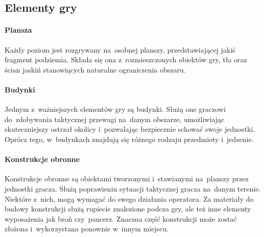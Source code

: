 \documentclass[licencjacka]{pracamgr}
\begin{document}
    \subsection{Elementy gry}
      \paragraph{Plansza}
	Każdy poziom jest rozgrywany na~osobnej planszy, przedstawiającej jakiś fragment podziemia. Składa się ona z~rozmieszczonych
	obiektów gry, tła oraz~ ścian jaskiń stanowiących naturalne ograniczenia obszaru.
      \paragraph{Budynki}
	Jednym z~ważniejszych elementów gry są budynki. Służą one graczowi do~zdobywania taktycznej przewagi na~danym
	obszarze, umożliwiając skuteczniejszy ostrzał okolicy i~pozwalając bezpiecznie schować swoje jednostki. Oprócz tego,
	w~budynkach znajdują się różnego rodzaju przedmioty i~jedzenie.
      \paragraph{Konstrukcje obronne}
	Konstrukcje obronne są obiektami tworzonymi i~stawianymi na~planszy przez jednostki gracza. Służą poprawieniu sytuacji
	taktycznej gracza na~danym terenie. Niektóre z~nich, mogą wymagać do swego działania operatora. Za materiały do budowy konstrukcji
	służą rupiecie znalezione podcza gry, ale też inne elementy wyposażenia jak broń czy~pancerz. Znaczna część konstrukcji może zostać
	złożona i~wykorzystana ponownie w~innym miejscu.
\end{document}
